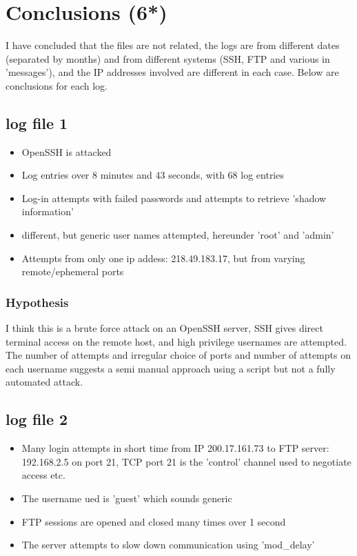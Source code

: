 \documentclass[
	letterpaper, %
	10pt, %
	unnumberedsections, %
	twoside, %
]{APAAssignment}
\begin{document}
\section{Conclusions (6*)}
I have concluded that the files are not related, the logs are from different dates (separated by months) and from different systems (SSH, FTP and various in 'messages'), and the IP addresses involved are different in each case. Below are conclusions for each log.



\subsection{log file 1}
\begin{itemize}
  \item OpenSSH is attacked  
  \item Log entries over 8 minutes and 43 seconds, with 68 log entries
  \item Log-in attempts with failed passwords and attempts to retrieve 'shadow information'
  \item different, but generic user names attempted, hereunder 'root' and 'admin'
  \item Attempts from only one ip addess: 218.49.183.17, but from varying remote/ephemeral ports
\end{itemize}

\subsubsection{Hypothesis}
I think this is a brute force attack on an OpenSSH server, SSH gives direct terminal access on the remote host, and high privilege usernames are attempted. The number of attempts and irregular choice of ports and number of attempts on each username suggests a semi manual approach using a script but not a fully automated attack.


\subsection{log file 2}
\begin{itemize}
	\item Many login attempts in short time from IP 200.17.161.73 to FTP server: 192.168.2.5 on port 21, TCP port 21 is the 'control' channel used to negotiate access etc. 
	\item The username ued is 'guest' which sounds generic
	\item FTP sessions are opened and closed many times over 1 second
	\item The server attempts to slow down communication using 'mod\_delay'
\end{itemize}
\end{document}
